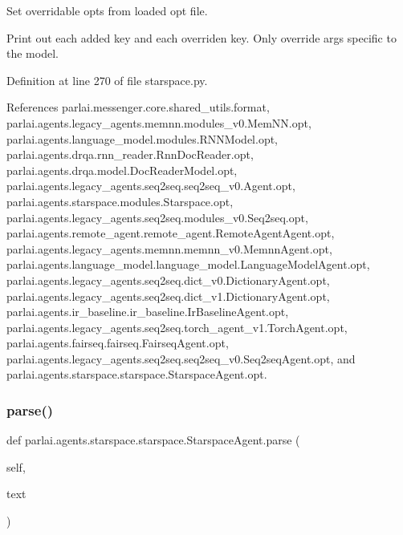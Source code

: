 \begin{DoxyVerb}Set overridable opts from loaded opt file.

Print out each added key and each overriden key.
Only override args specific to the model.
\end{DoxyVerb}
 

Definition at line 270 of file starspace.\+py.



References parlai.\+messenger.\+core.\+shared\+\_\+utils.\+format, parlai.\+agents.\+legacy\+\_\+agents.\+memnn.\+modules\+\_\+v0.\+Mem\+N\+N.\+opt, parlai.\+agents.\+language\+\_\+model.\+modules.\+R\+N\+N\+Model.\+opt, parlai.\+agents.\+drqa.\+rnn\+\_\+reader.\+Rnn\+Doc\+Reader.\+opt, parlai.\+agents.\+drqa.\+model.\+Doc\+Reader\+Model.\+opt, parlai.\+agents.\+legacy\+\_\+agents.\+seq2seq.\+seq2seq\+\_\+v0.\+Agent.\+opt, parlai.\+agents.\+starspace.\+modules.\+Starspace.\+opt, parlai.\+agents.\+legacy\+\_\+agents.\+seq2seq.\+modules\+\_\+v0.\+Seq2seq.\+opt, parlai.\+agents.\+remote\+\_\+agent.\+remote\+\_\+agent.\+Remote\+Agent\+Agent.\+opt, parlai.\+agents.\+legacy\+\_\+agents.\+memnn.\+memnn\+\_\+v0.\+Memnn\+Agent.\+opt, parlai.\+agents.\+language\+\_\+model.\+language\+\_\+model.\+Language\+Model\+Agent.\+opt, parlai.\+agents.\+legacy\+\_\+agents.\+seq2seq.\+dict\+\_\+v0.\+Dictionary\+Agent.\+opt, parlai.\+agents.\+legacy\+\_\+agents.\+seq2seq.\+dict\+\_\+v1.\+Dictionary\+Agent.\+opt, parlai.\+agents.\+ir\+\_\+baseline.\+ir\+\_\+baseline.\+Ir\+Baseline\+Agent.\+opt, parlai.\+agents.\+legacy\+\_\+agents.\+seq2seq.\+torch\+\_\+agent\+\_\+v1.\+Torch\+Agent.\+opt, parlai.\+agents.\+fairseq.\+fairseq.\+Fairseq\+Agent.\+opt, parlai.\+agents.\+legacy\+\_\+agents.\+seq2seq.\+seq2seq\+\_\+v0.\+Seq2seq\+Agent.\+opt, and parlai.\+agents.\+starspace.\+starspace.\+Starspace\+Agent.\+opt.

\mbox{\label{classparlai_1_1agents_1_1starspace_1_1starspace_1_1StarspaceAgent_ab08bd065e56f11ebe2ad30d3894c46c7}} 
\subsubsection{\texorpdfstring{parse()}{parse()}}
{\footnotesize\ttfamily def parlai.\+agents.\+starspace.\+starspace.\+Starspace\+Agent.\+parse (\begin{DoxyParamCaption}\item[{}]{self,  }\item[{}]{text }\end{DoxyParamCaption})}

